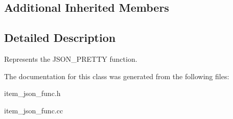 \subsection*{Additional Inherited Members}


\subsection{Detailed Description}
Represents the J\+S\+O\+N\+\_\+\+P\+R\+E\+T\+TY function. 

The documentation for this class was generated from the following files\+:\begin{DoxyCompactItemize}
\item 
item\+\_\+json\+\_\+func.\+h\item 
item\+\_\+json\+\_\+func.\+cc\end{DoxyCompactItemize}
